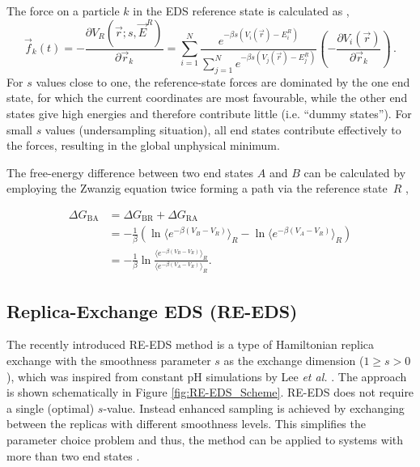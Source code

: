 The force on a particle $k$ in the EDS reference state is calculated as \cite{Christ2008},
\begin{equation}
    \vec{f}_k(t)=-\frac{\partial V_R(\vec{r}; s, \vec{E}^R)}{\partial \vec{r}_k} = \sum^N_{i=1}\frac{e^{-\beta s(V_i(\vec{r}) -E_i^R)}}{\sum^N_{j=1}{e^{-\beta s (V_j(\vec{r})-E_j^R)}}}  \left( -\frac{\partial V_i(\vec{r})}{\partial \vec{r}_k} \right) \,.
    \label{eq:laws_of_motion}
\end{equation}
%
For $s$ values close to one, the reference-state forces are dominated by the one end state, for which the current coordinates are most favourable, while the other end states give high energies and therefore contribute little (i.e. ``dummy states'').  
For small $s$ values (undersampling situation), all end states contribute effectively to the forces, resulting in the global unphysical minimum.

The free-energy difference between two end states $A$ and $B$ can be calculated by employing the Zwanzig equation twice forming a path via the reference state~$R$ \cite{Zwanzig1954,Christ2007,Christ2008},

\begin{align} \nonumber
    \Delta G_{\text{BA}} &=  \Delta G_{\text{BR}} + \Delta G_{\text{RA}} \\ 
    &=-\frac{1}{\beta}\left(\ln \langle e^{-\beta (V_B-V_R)}\rangle_R - \ln \langle e^{-\beta (V_A-V_R )}\rangle_R\right) \\ 
    &= -\frac{1}{\beta} \ln \frac{\langle e^{-\beta (V_B-V_R)}\rangle_R}{\langle e^{-\beta (V_A-V_R)}\rangle_R}.
    \label{EQ: Free Energy calculation via reference state}
 \end{align}

\FloatBarrier

\subsection{Replica-Exchange EDS (RE-EDS)}
The recently introduced RE-EDS method \cite{Sidler2016,Sidler2017} is a type of Hamiltonian replica exchange \cite{Hansmann1997,Sugita2000} with the smoothness parameter $s$ as the exchange dimension ($1 \geq s > 0$), which was inspired from constant pH simulations by Lee \textit{et al.} \cite{Lee2014,Lee2015}. The approach is shown schematically in Figure \ref{fig:RE-EDS_Scheme}.
RE-EDS does not require a single (optimal) $s$-value. Instead enhanced sampling is achieved by exchanging between the replicas with different smoothness levels. This simplifies the parameter choice problem and thus, the method can be applied to systems with more than two end states \cite{Sidler2016,Sidler2017}.

